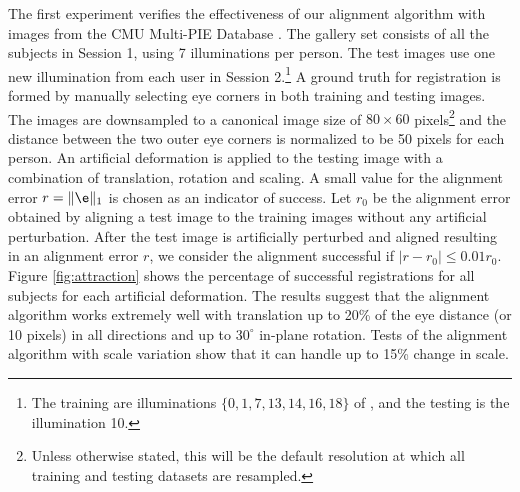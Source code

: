   The first experiment verifies the
    effectiveness of our alignment algorithm with images
    from the CMU Multi-PIE Database \cite{Gross2008-FGR}.
    The gallery set consists of all the subjects in Session 1, using 7
    illuminations per person. The test images use
    one new illumination from each user in Session
    2.\footnote{The training are illuminations $\{0, 1, 7,
    13, 14, 16, 18\}$ of \cite{Gross2008-FGR}, and the
    testing is the illumination 10. } A ground truth for
	registration is formed by manually selecting
    eye corners in both training and testing images. 
	The images are downsampled to a canonical image size of 
    $80\times 60$ pixels\footnote{Unless otherwise stated,
    this will be the default resolution at which 
    all training and testing datasets are resampled.} 
	and the distance between the two outer
    eye corners is normalized to be 50 pixels for each
    person. An artificial deformation is applied to the
    testing image with a combination of translation,
    rotation and scaling. A small value for the alignment
    error $r = \|\e\|_1$ is chosen as an indicator of success. Let $r_0$
    be the alignment error obtained by aligning a test
    image to the training images without any artificial
    perturbation. After the test image is artificially
    perturbed and aligned resulting in an alignment error
    $r$, we consider the alignment successful if $|r - r_0 | \leq
    0.01r_0$. Figure \ref{fig:attraction} shows the
    percentage of successful registrations for all subjects
    for each artificial deformation. The results suggest
    that the alignment algorithm works extremely well with
    translation up to 20\% of the eye distance (or 10
    pixels) in all directions and up to $30^\circ$ in-plane
    rotation. Tests of the alignment algorithm
    with scale variation show that it can handle up to 15\%
    change in scale.

